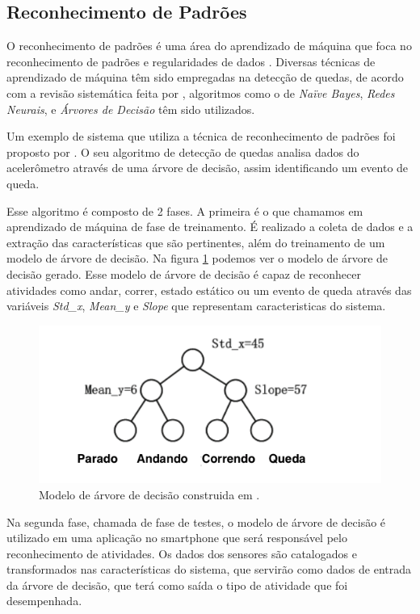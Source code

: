 \subsection{Reconhecimento de Padrões}
O reconhecimento de padrões é uma área do aprendizado de máquina que foca no reconhecimento de padrões e regularidades de dados \citep{anzai2012pattern}. Diversas técnicas de aprendizado de máquina têm sido empregadas na detecção de quedas, de acordo com a revisão sistemática feita por \cite{casilari2015analysis}, algoritmos como o de \textit{Naïve Bayes}, \textit{Redes Neurais}, e \textit{Árvores de Decisão} têm sido utilizados.


Um exemplo de sistema que utiliza a técnica de reconhecimento de padrões foi proposto por \cite{zhao2012fallalarm}. O seu algoritmo de detecção de quedas analisa dados do acelerômetro através de uma árvore de decisão, assim identificando um evento de queda. 

Esse algoritmo é composto de 2 fases. A primeira é o que chamamos em aprendizado de máquina de fase de treinamento. É realizado a coleta de dados e a extração das características que são pertinentes, além do treinamento de um modelo de árvore de decisão. Na figura \ref{fig:decision_tree} podemos ver o modelo de árvore de decisão gerado.  Esse modelo de árvore de decisão é capaz de reconhecer atividades como andar, correr, estado estático ou um evento de queda através das variáveis \textit{Std\_x}, \textit{Mean\_y} e \textit{Slope} que representam caracteristicas do sistema. 


\begin{figure}[ht]
	\centering
	\includegraphics[scale=0.6]{imagens/decision_tree.png}
	\caption{ Modelo de árvore de decisão construida em \cite{zhao2012fallalarm}.}
	\label{fig:decision_tree}
\end{figure} 


Na segunda fase, chamada de fase de testes, o modelo de árvore de decisão é utilizado em uma aplicação no smartphone que será responsável pelo reconhecimento de atividades. Os dados dos sensores são catalogados e transformados nas características do sistema, que servirão como dados de entrada da árvore de decisão, que terá como saída o tipo de atividade que foi desempenhada.

